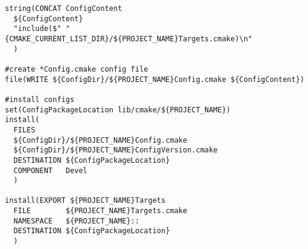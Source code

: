 \begin{frame}[fragile]
{\begin{verbatim}
string(CONCAT ConfigContent
  ${ConfigContent}
  "include($" "{CMAKE_CURRENT_LIST_DIR}/${PROJECT_NAME}Targets.cmake)\n"
  )

#create *Config.cmake config file
file(WRITE ${ConfigDir}/${PROJECT_NAME}Config.cmake ${ConfigContent})

#install configs
set(ConfigPackageLocation lib/cmake/${PROJECT_NAME})
install(
  FILES
  ${ConfigDir}/${PROJECT_NAME}Config.cmake
  ${ConfigDir}/${PROJECT_NAME}ConfigVersion.cmake
  DESTINATION ${ConfigPackageLocation}
  COMPONENT   Devel
  )

install(EXPORT ${PROJECT_NAME}Targets
  FILE        ${PROJECT_NAME}Targets.cmake
  NAMESPACE   ${PROJECT_NAME}::
  DESTINATION ${ConfigPackageLocation}
  )
\end{verbatim}
}
\end{frame}

